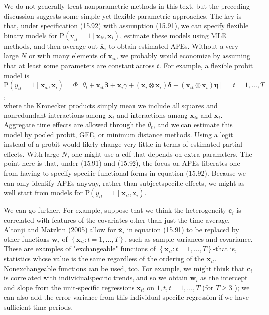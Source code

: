 \documentclass[10pt]{article}
\begin{document}
We do not generally treat nonparametric methods in this text, but the preceding discussion suggests some simple yet flexible parametric approaches. The key is that, under specification (15.92) with assumption (15.91), we can specify flexible binary models for $\mathrm{P}\left(\mathrm{y}_{i t}=1 \mid \mathbf{x}_{i t}, \overline{\mathbf{x}}_{i}\right)$, estimate these models using MLE methods, and then average out $\overline{\mathbf{x}}_{i}$ to obtain estimated APEs. Without a very large $N$ or with many elements of $\mathbf{x}_{i t}$, we probably would economize by assuming that at least some parameters are constant across $t$. For example, a flexible probit model is\\
$\mathrm{P}\left(y_{i t}=1 \mid \mathbf{x}_{i t}, \overline{\mathbf{x}}_{i}\right)=\Phi\left[\theta_{t}+\mathbf{x}_{i t} \boldsymbol{\beta}+\overline{\mathbf{x}}_{i} \gamma+\left(\overline{\mathbf{x}}_{i} \otimes \overline{\mathbf{x}}_{i}\right) \boldsymbol{\delta}+\left(\mathbf{x}_{i t} \otimes \overline{\mathbf{x}}_{i}\right) \boldsymbol{\eta}\right], \quad t=1, \ldots, T$,\\
where the Kronecker products simply mean we include all squares and nonredundant interactions among $\overline{\mathbf{x}}_{i}$ and interactions among $\mathbf{x}_{i t}$ and $\overline{\mathbf{x}}_{i}$. Aggregate time effects are allowed through the $\theta_{t}$, and we can estimate this model by pooled probit, GEE, or minimum distance methods. Using a logit instead of a probit would likely change very little in terms of estimated partial effects. With large $N$, one might use a cdf that depends on extra parameters. The point here is that, under (15.91) and (15.92), the focus on APEs liberates one from having to specify specific functional forms in equation (15.92). Because we can only identify APEs anyway, rather than subjectspecific effects, we might as well start from models for $\mathrm{P}\left(y_{i t}=1 \mid \mathbf{x}_{i t}, \overline{\mathbf{x}}_{i}\right)$.

We can go further. For example, suppose that we think the heterogeneity $\mathbf{c}_{i}$ is correlated with features of the covariates other than just the time average. Altonji and Matzkin (2005) allow for $\overline{\mathbf{x}}_{i}$ in equation (15.91) to be replaced by other functions $\mathbf{w}_{i}$ of $\left\{\mathbf{x}_{i t}: t=1, \ldots, T\right\}$, such as sample variances and covariance. These are examples of "exchangeable" functions of $\left\{\mathbf{x}_{i t}: t=1, \ldots, T\right\}$-that is, statistics whose value is the same regardless of the ordering of the $\mathbf{x}_{i t}$. Nonexchangeable functions can be used, too. For example, we might think that $\mathbf{c}_{i}$ is correlated with individualspecific trends, and so we obtain $\mathbf{w}_{i}$ as the intercept and slope from the unit-specific regressions $\mathbf{x}_{i t}$ on $1, t, t=1, \ldots, T$ (for $T \geq 3$ ); we can also add the error variance from this individual specific regression if we have sufficient time periods.
\end{document}
